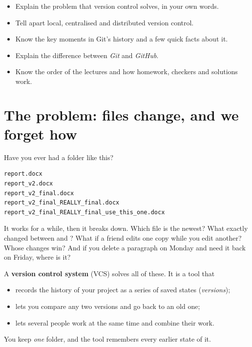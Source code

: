 


\begin{goals}
\begin{itemize}
  \item Explain the problem that version control solves, in your own words.
  \item Tell apart local, centralised and distributed version control.
  \item Know the key moments in Git's history and a few quick facts about it.
  \item Explain the difference between \emph{Git} and \emph{GitHub}.
  \item Know the order of the lectures and how homework, checkers and solutions work.
\end{itemize}
\end{goals}

\section{The problem: files change, and we forget how}

Have you ever had a folder like this?

\begin{lstlisting}
report.docx
report_v2.docx
report_v2_final.docx
report_v2_final_REALLY_final.docx
report_v2_final_REALLY_final_use_this_one.docx
\end{lstlisting}

It works for a while, then it breaks down. Which file is the newest? What exactly changed between  and ? What if a friend edits one copy while you edit another? Whose changes win? And if you delete a paragraph on Monday and need it back on Friday, where is it?

A \textbf{version control system} (VCS) solves all of these. It is a tool that
\begin{itemize}
  \item records the history of your project as a series of saved states (\emph{versions});
  \item lets you compare any two versions and go back to an old one;
  \item lets several people work at the same time and combine their work.
\end{itemize}
You keep \emph{one} folder, and the tool remembers every earlier state of it.

